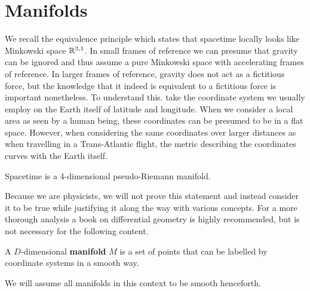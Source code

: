 \documentclass{article}
\begin{document}
 	\section{Manifolds}
 		We recall the equivalence principle which states that spacetime locally looks like Minkowski space $\mathbb{R}^{3,1}$. In small frames of reference we can presume that gravity can be ignored and thus assume a pure Minkowski space with accelerating frames of reference. In larger frames of reference, gravity does not act as a fictitious force, but the knowledge that it indeed is equivalent to a fictitious force is important nonetheless. To understand this. take the coordinate system we usually employ on the Earth itself of latitude and longitude. When we consider a local area as seen by a human being, these coordinates can be presumed to be in a flat space. However, when considering the same coordinates over larger distances as when travelling in a Trans-Atlantic flight, the metric describing the coordinates curves with the Earth itself.
 		
 		\begin{thm}
 			Spacetime is a 4-dimensional pseudo-Riemann manifold.
 		\end{thm}
 	
 		Because we are physicists, we will not prove this statement and instead consider it to be true while justifying it along the way with various concepts. For a more thorough analysis a book on differential geometry is highly recommended, but is not necessary for the following content.
 		
 		\begin{defn}
 			A $D$-dimensional\textbf{ manifold} $M$ is a set of points that can be labelled by coordinate systems in a smooth way.
 		\end{defn}
 		
 		We will assume all manifolds in this context to be smooth henceforth. 
 		
\end{document}
